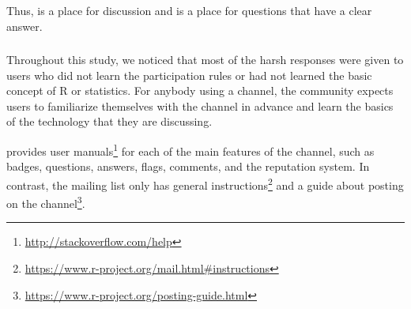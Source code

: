 

Thus, \RH is a place for discussion and \SO is a place for questions that have a clear answer.


\subsubsection{\recb}

    Throughout this study, we noticed that most of the harsh responses were given to users who did not learn the participation rules or had not learned the basic concept of R or statistics.
    For anybody using a channel, the community expects users to familiarize themselves with the channel in advance and learn the basics of the technology that they are discussing.


    \SO provides user manuals\footnote{\url{http://stackoverflow.com/help}} for each of the main features of the channel, such as badges, questions,
    answers, flags, comments, and the reputation system.     In contrast, the \RH mailing list only has general instructions\footnote{\url{https://www.r-project.org/mail.html\#instructions}} and a guide about posting on the channel\footnote{\url{https://www.r-project.org/posting-guide.html}}.

